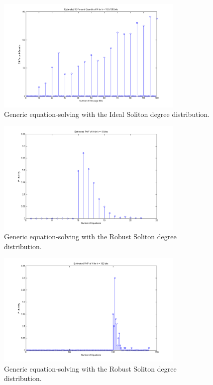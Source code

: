 \documentclass[11pt]{article}
\begin{document}
\begin{enumerate}
    \begin{figure}[H]
        \begin{center}
            \includegraphics[width = 0.8\textwidth]{figure_1b_90_percent_quantile_ideal.png}
            \caption{Generic equation-solving with the Ideal Soliton degree distribution.}
        \end{center}
    \end{figure}

    \begin{figure}[H]
        \begin{center}
            \includegraphics[width = 0.8\textwidth]{figure_1b_k10_robust.png}
            \caption{Generic equation-solving with the Robust Soliton degree distribution.}
        \end{center}
    \end{figure}

    \begin{figure}[H]
        \begin{center}
            \includegraphics[width = 0.8\textwidth]{figure_1b_k100_robust.png}
            \caption{Generic equation-solving with the Robust Soliton degree distribution.}
        \end{center}
    \end{figure}


\end{enumerate}
\end{document}
